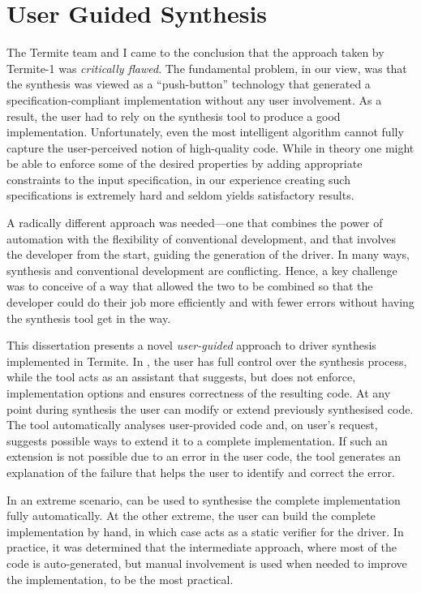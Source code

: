 \section{User Guided Synthesis}

The Termite team and I came to the conclusion that the approach taken by Termite-1 was \emph{critically flawed}.  The fundamental problem, in our view, was that the synthesis was viewed as a ``push-button'' technology that generated a specification-compliant implementation without any user involvement.  As a result, the user had to rely on the synthesis tool to produce a good implementation.  Unfortunately, even the most intelligent algorithm cannot fully capture the user-perceived notion of high-quality code.  While in theory one might be able to enforce some of the desired properties by adding appropriate constraints to the input specification, in our experience creating such specifications is extremely hard and seldom yields satisfactory results.

A radically different approach was needed---one that combines the power of automation with the flexibility of conventional development, and that involves the developer from the start, guiding the generation of the driver.  In many ways, synthesis and conventional development are conflicting.  Hence, a key challenge was to conceive of a way that allowed the two to be combined so that the developer could do their job more efficiently and with fewer errors without having the synthesis tool get in the way.

This dissertation presents a novel \emph{user-guided} approach to driver synthesis implemented in Termite.  In \termite, the user has full control over the synthesis process, while the tool acts as an assistant that suggests, but does not enforce, implementation options and ensures correctness of the resulting code.  At any point during synthesis the user can modify or extend previously synthesised code.  The tool automatically analyses user-provided code and, on user's request, suggests possible ways to extend it to a complete implementation.  If such an extension is not possible due to an error in the user code, the tool generates an explanation of the failure that helps the user to identify and correct the error.

In an extreme scenario, \termite can be used to synthesise the complete implementation fully automatically.  At the other extreme, the user can build the complete implementation by hand, in which case \termite acts as a static verifier for the driver.  In practice, it was determined that the intermediate approach, where most of the code is auto-generated, but manual involvement is used when needed to improve the implementation, to be the most practical.

